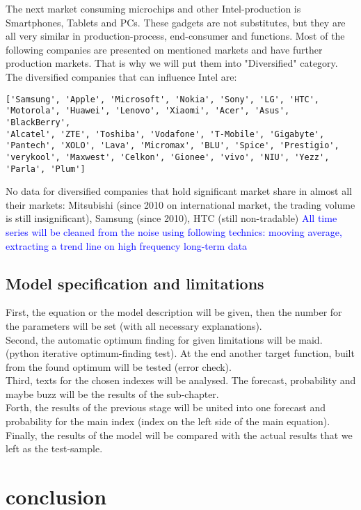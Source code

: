 \documentclass {article}
\begin{document}
The next market consuming microchips and other Intel-production is Smartphones, Tablets and PCs. These gadgets are not substitutes, but they are all very similar in production-process, end-consumer and functions. Most of the following companies are presented on mentioned markets and have further production markets. That is why we will put them into "Diversified" category. The diversified companies that can influence Intel are:
\begin{verbatim}
['Samsung', 'Apple', 'Microsoft', 'Nokia', 'Sony', 'LG', 'HTC',
'Motorola', 'Huawei', 'Lenovo', 'Xiaomi', 'Acer', 'Asus', 'BlackBerry',
'Alcatel', 'ZTE', 'Toshiba', 'Vodafone', 'T-Mobile', 'Gigabyte',
'Pantech', 'XOLO', 'Lava', 'Micromax', 'BLU', 'Spice', 'Prestigio',
'verykool', 'Maxwest', 'Celkon', 'Gionee', 'vivo', 'NIU', 'Yezz',
'Parla', 'Plum']
\end{verbatim} 

No data for diversified companies that hold significant market share in almost all their markets: Mitsubishi (since 2010 on international market, the trading volume is still insignificant), Samsung (since 2010), HTC (still non-tradable)
\textcolor{blue}{All time series will be cleaned from the noise using following technics: mooving average, extracting a trend line on high frequency long-term data} 
\subsection{Model specification and limitations}
First, the equation or the model description will be given, then the number for the parameters will be set (with all necessary explanations).\\
Second, the automatic optimum finding for given limitations will be maid. (python iterative optimum-finding test). At the end another target function, built from the found optimum will be tested (error check).\\
Third, texts for the chosen indexes will be analysed. The forecast, probability and maybe buzz will be the results of the sub-chapter.\\
Forth, the results of the previous stage will be united into one forecast and probability for the main index (index on the left side of the main equation).\\
Finally, the results of the model will be compared with the actual results that we left as the test-sample.

\newpage
\section{conclusion}
\end{document}

